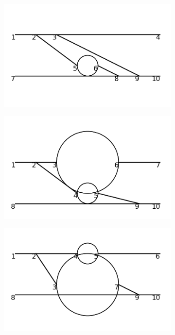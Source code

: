 \documentclass[11pt,a4paper,twoside,pdf]{article}
\numberwithin{equation}{section}
\begin{document}
\begin{figure}[h!]
\begin{subfigure}[t]{0.16\textwidth}
    \end{subfigure}
    \hfill
    \begin{subfigure}[t]{0.16\textwidth}
        \centering
        \includegraphics[width=\textwidth]{plots/order6_2to2/51.png}
    \end{subfigure}
    \hfill
    \begin{subfigure}[t]{0.16\textwidth}
        \centering
        \includegraphics[width=\textwidth]{plots/order6_2to2/52.png}
    \end{subfigure}
    \hfill
    \begin{subfigure}[t]{0.16\textwidth}
        \centering
        \includegraphics[width=\textwidth]{plots/order6_2to2/53.png}

\end{subfigure}
\end{figure}
\end{document}
